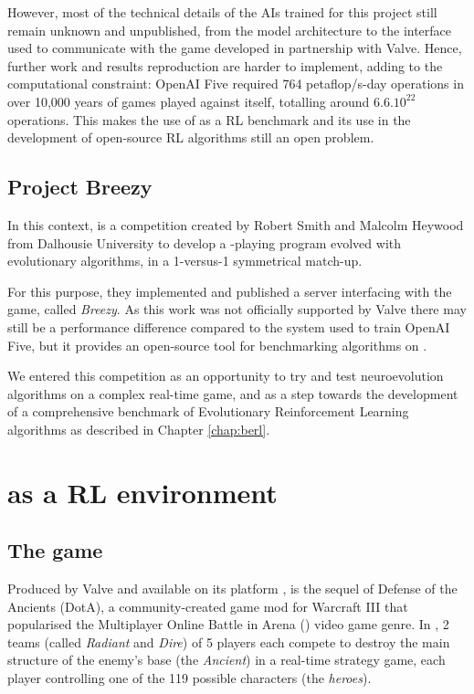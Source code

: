 However, most of the technical details of the AIs trained for this project still remain unknown and unpublished, from the model architecture to the interface used to communicate with the game developed in partnership with Valve. Hence, further work and results reproduction are harder to implement, adding to the computational constraint: OpenAI Five required 764 petaflop/s-day operations in over 10,000 years of games played against itself, totalling around $6.6.10^{22}$ operations. This makes the use of \dota as a RL benchmark and its use in the development of open-source RL algorithms still an open problem. 

\subsection{Project Breezy}

In this context,  is a competition created by Robert Smith and Malcolm Heywood from Dalhousie University to develop a \dota-playing program evolved with evolutionary algorithms, in a 1-versus-1 symmetrical match-up. 

For this purpose, they implemented and published a server interfacing with the \dota game, called \textit{Breezy}. As this work was not officially supported by Valve there may still be a performance difference compared to the system used to train OpenAI Five, but it provides an open-source tool for benchmarking algorithms on \dota.

We entered this competition as an opportunity to try and test neuroevolution algorithms on a complex real-time game, and as a step towards the development of a comprehensive benchmark of Evolutionary Reinforcement Learning algorithms as described in Chapter \ref{chap:berl}.

\section{\dota as a RL environment}
\subsection{The game}

Produced by Valve and available on its platform ,  is the sequel of Defense of the Ancients (DotA), a community-created game mod for Warcraft III that popularised the Multiplayer Online Battle in Arena () video game genre. In \dota, 2 teams (called \textit{Radiant} and \textit{Dire}) of 5 players each compete to destroy the main structure of the enemy's base (the \textit{Ancient}) in a real-time strategy game, each player controlling one of the 119 possible characters (the \textit{heroes}).


